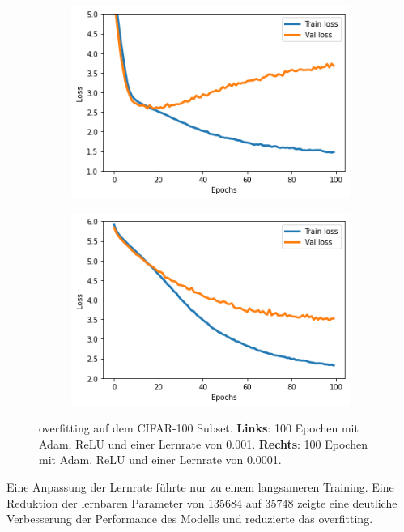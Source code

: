 \begin{figure}[H]
  \centering
  \vspace{1cm}
  \begin{subfigure}
    \centering
    \includegraphics[width=.48\textwidth]{resources/experiments/cifar_100_324_0001.png}
  \end{subfigure}
  \begin{subfigure}
    \centering
    \includegraphics[width=.48\textwidth]{resources/experiments/cifar_100_324_00001.png}
  \end{subfigure}

  \caption{\gls{overfitting} auf dem CIFAR-100 Subset. \textbf{Links}: 100 Epochen mit Adam, ReLU und einer Lernrate von 0.001. \textbf{Rechts}:
  100 Epochen mit Adam, ReLU und einer Lernrate von 0.0001.}
  \label{image:gute-ergebnisse-cifar}
\end{figure}

Eine Anpassung der Lernrate führte nur zu einem langsameren Training. Eine Reduktion der lernbaren Parameter von 135684 auf 35748 zeigte 
eine deutliche Verbesserung der Performance des Modells und reduzierte das \gls{overfitting}.

